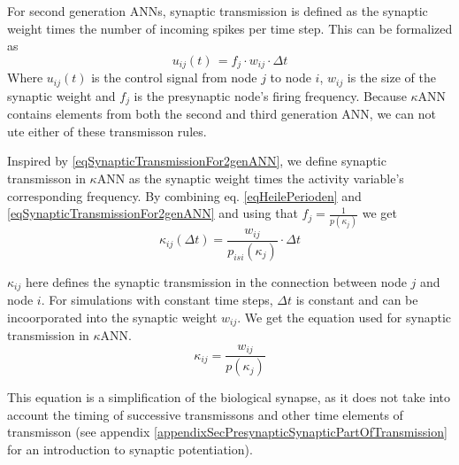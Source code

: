 		For second generation ANNs, synaptic transmission is defined as the synaptic weight times the number of incoming spikes per time step.
		This can be formalized as
		\begin{equation}
			u_{ij}(t) \, = f_{j} \cdot w_{ij} \cdot \Delta t
			\label{eqSynapticTransmissionFor2genANN}
		\end{equation}
		Where $u_{ij}(t)$ is the control signal from node $j$ to node $i$, $w_{ij}$ is the size of the synaptic weight %
			and $f_j$ is the presynaptic node's firing frequency.
		Because $\kappa$ANN contains elements from both the second and third generation ANN, %
																							 we can not ute either of these transmisson rules.

		Inspired by \eqref{eqSynapticTransmissionFor2genANN}, we define synaptic transmisson in $\kappa$ANN as the synaptic weight times the activity variable's corresponding frequency.
		By combining eq. \eqref{eqHeilePerioden} and \eqref{eqSynapticTransmissionFor2genANN} and using that $f_j = \frac{1}{p(\kappa_j)}$ we get
		\begin{equation}
			\kappa_{ij}(\Delta t) = \frac{ w_{ij} }{ p_{isi}(\kappa_j)} \cdot \Delta t  %
		\end{equation}
 		
		$\kappa_{ij}$ here defines the synaptic transmission in the connection between node $j$ and node $i$.
		For simulations with constant time steps, $\Delta t$ is constant and can be incoorporated into the synaptic weight $w_{ij}$.
		We get the equation used for synaptic transmission in $\kappa$ANN.
		\begin{equation}
			\kappa_{ij} = \frac{ w_{ij} }{ p(\kappa_j)}
			\label{eqSynapticTransmissionForKANN}
		\end{equation}

		This equation is a simplification of the biological synapse, as it does not take into account the timing of successive transmissons and other time elements of transmisson 
			(see appendix \ref{appendixSecPresynapticSynapticPartOfTransmission} for an introduction to synaptic potentiation). 

